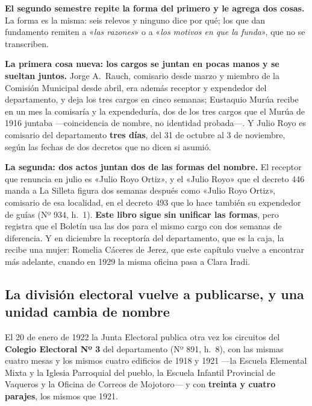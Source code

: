 \begin{cautela}
\textbf{El segundo semestre repite la forma del primero y le agrega dos cosas.} La forma es la
misma: seis relevos y ninguno dice por qué; los que dan fundamento remiten a «\textit{las razones}»
o a «\textit{los motivos en que la funda}», que no se transcriben.

\textbf{La primera cosa nueva: los cargos se juntan en pocas manos y se sueltan juntos.} Jorge
A.\ Rauch, comisario desde marzo y miembro de la Comisión Municipal desde abril, era además
receptor y expendedor del departamento, y deja los tres cargos en cinco semanas; Eustaquio Murúa
recibe en un mes la comisaría y la expendeduría, dos de los tres cargos que el Murúa de 1916 juntaba ---coincidencia
de nombre, no identidad probada---. Y Julio Royo es comisario del departamento \textbf{tres días},
del 31 de octubre al 3 de noviembre, según las fechas de dos decretos que no dicen si asumió.

\textbf{La segunda: dos actos juntan dos de las formas del nombre.} El receptor que renuncia en
julio es «Julio Royo Ortiz», y el «Julio Royo» que el decreto 446 manda a La Silleta figura dos
semanas después como «Julio Royo Ortiz», comisario de esa localidad, en el decreto 493 que lo hace
también su expendedor de guías (Nº 934, h.\ 1). \textbf{Este libro sigue sin unificar las
formas}, pero registra que el Boletín usa las dos para el mismo cargo con dos semanas de
diferencia. Y en diciembre la receptoría del departamento, que es la caja, la recibe una mujer:
Romelia Cáceres de Jerez, que este capítulo vuelve a encontrar más adelante, cuando en 1929 la misma
oficina pasa a Clara Iradi.
\end{cautela}

\subsection*{La división electoral vuelve a publicarse, y una unidad cambia de nombre}

El 20 de enero de 1922 la Junta Electoral publica otra vez los circuitos del \textbf{Colegio
Electoral Nº 3} del departamento (Nº 891, h.\ 8), con las mismas cuatro mesas y los mismos cuatro
edificios de 1918 y 1921 ---la Escuela Elemental Mixta y la Iglesia Parroquial del pueblo, la
Escuela Infantil Provincial de Vaqueros y la Oficina de Correos de Mojotoro--- y con
\textbf{treinta y cuatro parajes}, los mismos que 1921.

